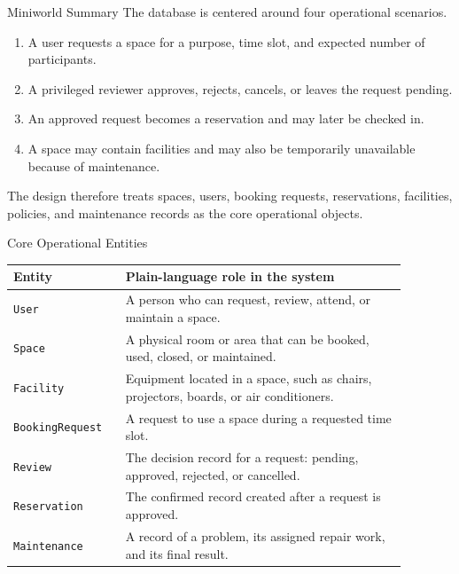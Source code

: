 \documentclass[aspectratio=169]{beamer}
\begin{document}
\begin{frame}{Miniworld Summary}
    The database is centered around four operational scenarios.

    \begin{enumerate}
        \item A user requests a space for a purpose, time slot, and expected number of participants.
        \item A privileged reviewer approves, rejects, cancels, or leaves the request pending.
        \item An approved request becomes a reservation and may later be checked in.
        \item A space may contain facilities and may also be temporarily unavailable because of maintenance.
    \end{enumerate}

    \vspace{0.3cm}
    The design therefore treats spaces, users, booking requests, reservations,
    facilities, policies, and maintenance records as the core operational objects.
\end{frame}

\begin{frame}{Core Operational Entities}
    \begin{table}
        \small
        \begin{tabular}{p{0.24\linewidth} p{0.64\linewidth}}
            \toprule
            \textbf{Entity} & \textbf{Plain-language role in the system} \\
            \midrule
            \texttt{User} & A person who can request, review, attend, or maintain a space. \\
            \texttt{Space} & A physical room or area that can be booked, used, closed, or maintained. \\
            \texttt{Facility} & Equipment located in a space, such as chairs, projectors, boards, or air conditioners. \\
            \texttt{BookingRequest} & A request to use a space during a requested time slot. \\
            \texttt{Review} & The decision record for a request: pending, approved, rejected, or cancelled. \\
            \texttt{Reservation} & The confirmed record created after a request is approved. \\
            \texttt{Maintenance} & A record of a problem, its assigned repair work, and its final result. \\
            \bottomrule
        \end{tabular}
    \end{table}
\end{frame}
\end{document}
